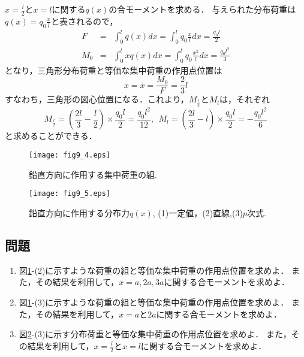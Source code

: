 \documentclass[10pt,a4j]{jbook}
\begin{document}
\begin{enumerate}
$x=\frac{l}{2}$と$x=l$に関する$q(x)$の合モーメントを求める．
与えられた分布荷重は$q(x)=q_0\frac{x}{l}$と表されるので，
\begin{eqnarray}
	F&= & \int _0^l q(x)dx = \int_0^l q_0 \frac{x}{l}dx=\frac{q_0l}{2}
	\label{eqn:}
	\\
	M_0&= & \int _0^l xq(x)dx = \int_0^l q_0 \frac{x^2}{l}dx=\frac{q_0l^2}{3}
	\label{eqn:}
\end{eqnarray}
となり，三角形分布荷重と等価な集中荷重の作用点位置は
\begin{equation}
	x=\bar x = \frac{M_0}{F}=\frac{2}{3}l
	\label{eqn:xbar_tri}
\end{equation}
すなわち，三角形の図心位置になる．これより，$M_{\frac{l}{2}}$と$M_l$は，それぞれ
\begin{equation}
	M_{\frac{l}{2}}=\left(\frac{2l}{3}-\frac{l}{2}\right) \times \frac{q_0l}{2} =\frac{q_0l^2}{12}, \ \ 
	M_l = \left(\frac{2l}{3}-l \right) \times \frac{q_0l}{2} =-\frac{q_0l^2}{6}
	\label{eqn:}
\end{equation}
と求めることができる．
\end{enumerate}
\begin{figure}[h]
	\begin{center}
	\texttt{[image: fig9\_4.eps]} 
	\end{center}
	\caption{
		鉛直方向に作用する集中荷重の組.
	} 
	\label{fig:fig9_4}
\end{figure}
\begin{figure}[h]
	\begin{center}
	\texttt{[image: fig9\_5.eps]} 
	\end{center}
	\caption{
		鉛直方向に作用する分布力$q(x)$, (1)一定値，(2)直線,(3)$p$次式.
	} 
	\label{fig:fig9_5}
\end{figure}
\subsection{問題}
\begin{enumerate}
\item
	図\ref{fig:fig9_4}-(2)に示すような荷重の組と等価な集中荷重の作用点位置を求めよ．
	また，その結果を利用して，$x=a,2a,3a$に関する合モーメントを求めよ．
\item
	図\ref{fig:fig9_4}-(3)に示すような荷重の組と等価な集中荷重の作用点位置を求めよ．
	また，その結果を利用して，$x=a$と$2a$に関する合モーメントを求めよ．
\item
	図\ref{fig:fig9_5}-(3)に示す分布荷重と等価な集中荷重の作用点位置を求めよ．
		また，その結果を利用して，$x=\frac{l}{2}$と$x=l$に関する合モーメントを求めよ．
\end{enumerate}
\end{document}

